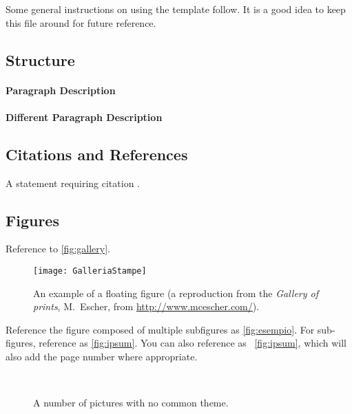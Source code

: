Some general instructions on using the template follow.
It is a good idea to keep this file around for future reference.


\subsection{Structure}
\label{sec:instructions:structure}
\lipsum[6] %

\paragraph{Paragraph Description} \lipsum[7] %

\paragraph{Different Paragraph Description} \lipsum[8] %


\subsection{Citations and References}
\label{sec:instructions:references}
A statement requiring citation \cite{Figueredo:2009dg}.


\subsection{Figures}
\label{sec:instructions:figures}

Reference to \autoref{fig:gallery}.

\begin{figure}[tb]
\centering
\texttt{[image: GalleriaStampe]}
\caption[An example of a floating figure]{
  An example of a floating figure (a reproduction from the
  \emph{Gallery of prints}, M.~Escher,
  from \url{http://www.mcescher.com/}).
}
\label{fig:gallery}
\end{figure}

Reference the figure composed of multiple subfigures as \autoref{fig:esempio}.
For sub-figures, reference as \autoref{fig:ipsum}.
You can also reference as \figureautorefname~\vref{fig:ipsum},
which will also add the page number where appropriate.

\lipsum[15-18] %

\begin{figure}[tb]
\centering
{} \quad
{} \\
 \quad
{}
\caption[A number of pictures.]{A number of pictures with no common theme.} %
\label{fig:esempio}
\end{figure}

